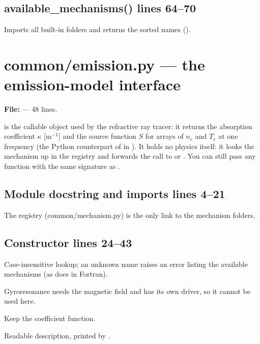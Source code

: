 \section*{\normalsize available\_mechanisms() \hfill{\small\mdseries\color{gray}lines 64--70}}

Imports all built-in folders and returns the sorted names ().


\chapter{common/emission.py --- the emission-model interface}
\label{mod:common:emission.py}
\textbf{File:}  --- 48 lines.

 is the callable object used by the refractive ray tracer: it
returns the absorption coefficient $\kappa$ [m$^{-1}$] and the source function $S$ for
arrays of $n_e$ and $T_e$ at one frequency (the Python counterpart of
 in ). It holds no physics itself:
it looks the mechanism up in the registry and forwards the call to
 or . You can still pass any
function with the same signature as .

\section*{\normalsize Module docstring and imports \hfill{\small\mdseries\color{gray}lines 4--21}}

\begin{lines}
\item[L.21] The registry (common/mechanism.py) is the only link to the mechanism folders.
\end{lines}
\section*{\normalsize Constructor \hfill{\small\mdseries\color{gray}lines 24--43}}

\begin{lines}
\item[L.33–34] Case-insensitive lookup; an unknown name raises an error listing the available mechanisms (as  does in Fortran).
\item[L.35–36] Gyroresonance needs the magnetic field and has its own driver, so it cannot be used here.
\item[L.40] Keep the coefficient function.
\item[L.42] Readable description, printed by .
\end{lines}
